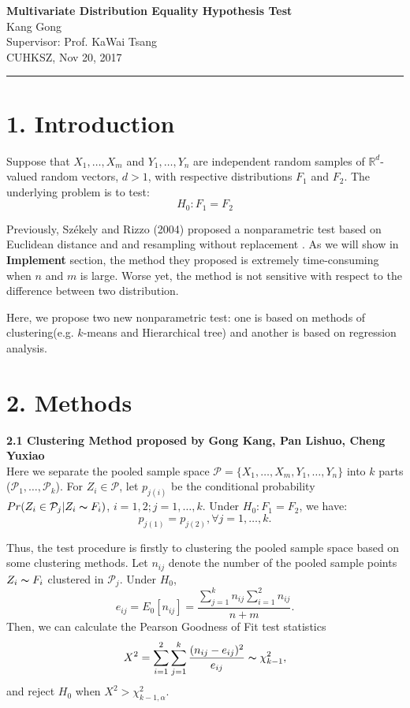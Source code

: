 \documentclass[12pt,a4paper]{article}
\newcommand{\R}{\mathbb{R}}
\begin{document}
\begin{center}
\textbf{Multivariate Distribution Equality Hypothesis Test}\\
Kang Gong\\
Supervisor: Prof. KaWai Tsang\\
CUHKSZ, Nov 20, 2017
\end{center}
\rule{\textwidth}{0.5pt}

\section*{1. Introduction}
Suppose that $X_1, \dots, X_{m}$ and $Y_1, \dots, Y_{n}$ are independent random samples of $\R^d$-valued random vectors, $d > 1$, with respective distributions $F_1$ and $F_2$. The underlying problem is to test:
\[
H_0: F_1 = F_2
\]

Previously, Sz\'{e}kely and Rizzo (2004) \cite{szekely2004testing} proposed a nonparametric test based on Euclidean distance and and resampling without replacement . As we will show in \textbf{Implement} section, the method they proposed is extremely time-consuming when $n$ and $m$ is large. Worse yet, the method is not sensitive with respect to the difference between two distribution.

Here, we propose two new nonparametric test: one is based on methods of clustering(e.g. $k$-means and Hierarchical tree) and another is based on regression analysis.

\section*{2. Methods}
\textbf{\large 2.1 Clustering Method \small proposed by Gong Kang, Pan Lishuo, Cheng Yuxiao}\\
Here we separate the pooled sample space $\mathcal{P} = \{X_1, \dots, X_m, Y_1, \dots, Y_n\}$ into $k$ parts ($\mathcal{P}_1, \dots, \mathcal{P}_k$). For $Z_i \in \mathcal{P}$, let $p_{j(i)}$ be the conditional probability $Pr(Z_i \in \mathcal{P}_j | Z_i \thicksim F_i)$, $i = 1, 2; j = 1, \dots, k$. Under $H_0: F_1 = F_2$, we have:
\[
p_{j(1)} = p_{j(2)}, \forall j = 1, \dots, k.
\]

Thus, the test procedure is firstly to clustering the pooled sample space based on some clustering methods. Let $n_{ij}$ denote the number of the pooled sample points $Z_i \thicksim F_i$ clustered in $\mathcal{P}_j$. Under $H_0$,
\[
e_{ij}=E_0[n_{ij}] = \dfrac{\sum_{j=1}^{k}n_{ij}\sum_{i=1}^{2}n_{ij}}{n+m}.
\]
Then, we can calculate the Pearson Goodness of Fit test statistics 
\[
X^2 = \sum_{i=1}^{2}\sum_{j=1}^{k}\dfrac{(n_{ij} - e_{ij})^2}{e_{ij}} \thicksim \chi^2_{k-1},
\]
and reject $H_0$ when $X^2 > \chi^2_{k-1, \alpha}$.
\end{document}
